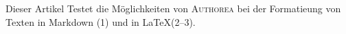 Dieser Artikel Testet die Möglichkeiten von \textsc{Authorea} bei der Formatieung von Texten in Markdown (1) und in \LaTeX (2–3).
